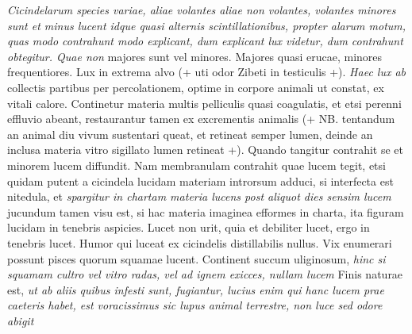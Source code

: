 \pstart\textit{Cicindelarum species\protect{} variae, aliae volantes aliae non volantes, volantes minores sunt et minus lucent idque quasi alternis scintillationibus, propter alarum motum, quas modo contrahunt modo explicant, dum explicant lux videtur, dum contrahunt obtegitur. Quae non } majores sunt vel minores. Majores quasi erucae, minores frequentiores. Lux in extrema alvo (+ uti odor Zibeti\protect{} in testiculis\protect{} +). \textit{Haec lux ab } collectis partibus per percolationem\protect{}, optime in corpore animali ut constat, ex vitali calore. Continetur materia multis pelliculis\protect{} quasi coagulatis, et etsi perenni effluvio abeant, restaurantur tamen ex excrementis animalis (+ NB. tentandum an animal diu vivum sustentari queat, et retineat semper lumen, deinde an inclusa materia vitro sigillato\protect{} lumen retineat +). Quando tangitur contrahit se et minorem lucem diffundit. Nam membranulam contrahit quae lucem tegit, etsi quidam putent a cicindela lucidam materiam introrsum adduci, si interfecta est nitedula, et \textit{spargitur in chartam materia lucens post aliquot dies sensim lucem } jucundum tamen visu est, si hac materia imaginea efformes in charta, ita figuram lucidam in tenebris aspicies. Lucet non urit, quia et debiliter lucet, ergo in tenebris lucet. Humor qui luceat ex cicindelis distillabilis nullus. Vix enumerari possunt pisces\protect{} quorum squamae lucent. Continent succum uliginosum\protect{}, \textit{hinc si squamam cultro vel vitro radas, vel ad ignem exicces, nullam lucem } Finis naturae est, \textit{ut ab aliis quibus infesti sunt, fugiantur, lucius enim qui hanc lucem prae caeteris habet,
est voracissimus sic lupus\protect{} animal terrestre,
non luce sed odore\protect{} abigit
}
